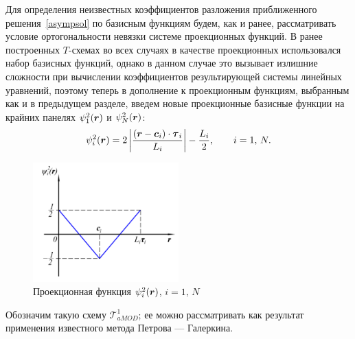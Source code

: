 \documentclass[12pt, a4paper]{article}
\renewcommand{\vec}[1]{\text{\mathversion{bold}${#1}$}}%
\begin{document}
Для определения неизвестных коэффициентов разложения приближенного решения~\eqref{asympsol} по базисным функциям будем, как и ранее, рассматривать условие ортогональности невязки системе проекционных функций.
В ранее построенных $T$-схемах во всех случаях в качестве проекционных использовался набор базисных функций, однако в данном случае это вызывает излишние сложности при вычислении коэффициентов результирующей системы линейных уравнений, поэтому теперь в дополнение к проекционным функциям, выбранным как и в предыдущем разделе, введем новые проекционные базисные функции на крайних панелях $\psi_1^2(\vec r)$ и $\psi_N^2(\vec r)$:
\begin{equation}
\label{psi2}
	\psi_i^2(\vec r)=2\left|\frac{(\vec r -\vec c_i)\cdot\vec\tau_i}{L_i}\right|-\frac{L_i}{2},\qquad i=1,\,N.
\end{equation}

\begin{figure}[!h]
	\centering
	\includegraphics[width=0.5\textwidth]{phi2}%
	\caption{\label{phi2}Проекционная функция $\psi_i^2(\vec r)$, $i=1,\,N$}
	\vspace*{-2mm}
\end{figure}

Обозначим такую схему $\mathcal{T}^1_{aMOD}$; ее можно рассматривать как результат применения известного метода Петрова --- Галеркина.
\end{document}
